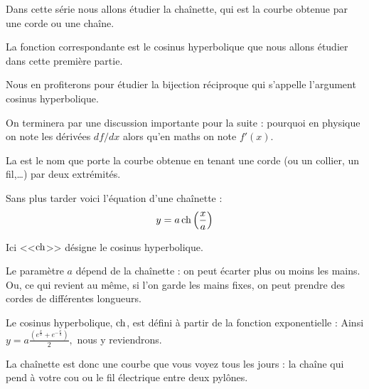 







\debuttexte


\diapo

\change

\change
Dans cette série nous allons étudier la chaînette, 
qui est la courbe obtenue par une corde ou une chaîne.

\change
La fonction correspondante est le cosinus hyperbolique 
que nous allons étudier dans cette première
partie.

\change
Nous en profiterons pour étudier la bijection réciproque qui s'appelle l'argument
cosinus hyperbolique.

\change
On terminera par une discussion importante pour la suite :
pourquoi en physique on note les dérivées $df/dx$
alors qu'en maths on note $f'(x)$.


\diapo


La  est le nom que porte la courbe obtenue en tenant 
une corde (ou un collier, un fil,\ldots) par deux extrémités.

\change
Sans plus tarder voici l'équation d'une chaînette :
$$y = a \mathop{\mathrm{ch}}\nolimits\left( \frac x a \right)$$

Ici <<$\mathop{\mathrm{ch}}\nolimits$>> désigne le cosinus hyperbolique.

\change
Le paramètre $a$ dépend de la chaînette : on peut écarter plus ou moins les mains.
Ou, ce qui revient au même, si l'on garde les mains fixes, on peut prendre des cordes de différentes longueurs.

\change

\change

\change

\change

Le cosinus hyperbolique, $\mathop{\mathrm{ch}}\nolimits$, 
est défini à partir de la fonction exponentielle :
Ainsi $y =  a \frac{\left( e^{\frac x a} + e^{-\frac x a} \right)}{2},$
 nous y reviendrons.





\diapo


La chaînette est donc une courbe que vous voyez tous les jours :
la chaîne qui pend à votre cou ou le fil électrique entre deux pylônes.

